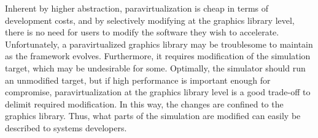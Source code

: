 Inherent by higher abstraction, paravirtualization is cheap in terms of development costs, and by selectively modifying at the graphics library level, there is no need for users to modify the software they wish to accelerate.
Unfortunately, a paravirtualized graphics library may be troublesome to maintain as the framework evolves.
Furthermore, it requires modification of the simulation target, which may be undesirable for some.
Optimally, the simulator should run an unmodified target, but if high performance is important enough for compromise, paravirtualization at the graphics library level is a good trade-off to delimit required modification.
In this way, the changes are confined to the graphics library.
Thus, what parts of the simulation are modified can easily be described to systems developers.
